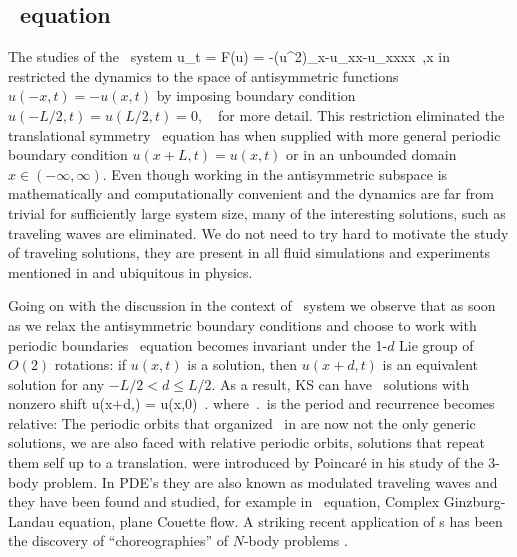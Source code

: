 \subsection{\KS\ equation}

The studies of the \KS\ system
\beq
  u_t = F(u) = -{\textstyle{}}(u^2)_x-u_{xx}-u_{xxxx}
    \,,\qquad   x \in [-L/2,L/2]
in  restricted the dynamics
to the space of antisymmetric functions $u(-x,t)=-u(x,t)$ by imposing
boundary condition $u(-L/2,t)=u(L/2,t)=0$, \cf\  for more
detail. This restriction eliminated the translational symmetry \KS\ equation
has when supplied with more general periodic boundary condition $u(x+L,t)=u(x,t)$ or
in an unbounded domain $x\in(-\infty,\infty)$. Even though working in the antisymmetric
subspace is mathematically and computationally convenient and the dynamics are far
from trivial for sufficiently large system size, many of the interesting solutions,
such as traveling waves are eliminated. We do not need to try hard to motivate the
study of traveling solutions, they are present in all fluid simulations and experiments
mentioned in  and ubiquitous in physics.

Going on with the discussion in the context of \KS\ system we observe that as soon as
we relax the antisymmetric boundary conditions and choose to work with periodic boundaries
\KS\ equation becomes invariant under the 1-$d$ Lie group of $O(2)$ rotations: if
$u(x,t)$ is a solution, then $u(x+d,t)$ is an equivalent
solution for any $-L/2 < d \leq L/2$.
As a result,
KS can have \rpo\ solutions with nonzero shift
\beq
u(x+d,\period{}) = u(x,0)
\,.
where $\period{}$ is the period and recurrence becomes
relative: The periodic orbits that organized \statesp\ in
 are now not the
only generic solutions, we are also faced with relative
periodic orbits, solutions that repeat them self up to a
translation. were introduced by Poincar\'e in his study of the
3-body problem. In PDE's they are also
known as modulated traveling waves and they have been found and
studied, for example in \KS\ equation, Complex
Ginzburg-Landau equation, plane Couette
flow. A striking recent application of \rpo s has
been the discovery of ``choreographies'' of $N$-body problems%
.

